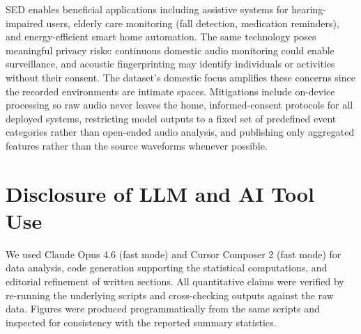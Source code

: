\documentclass{article}
\begin{document}
SED enables beneficial applications including assistive systems for hearing-impaired users, elderly care monitoring (fall detection, medication reminders), and energy-efficient smart home automation. The same technology poses meaningful privacy risks: continuous domestic audio monitoring could enable surveillance, and acoustic fingerprinting may identify individuals or activities without their consent. The dataset's domestic focus amplifies these concerns since the recorded environments are intimate spaces. Mitigations include on-device processing so raw audio never leaves the home, informed-consent protocols for all deployed systems, restricting model outputs to a fixed set of predefined event categories rather than open-ended audio analysis, and publishing only aggregated features rather than the source waveforms whenever possible.

\section{Disclosure of LLM and AI Tool Use}

We used Claude Opus 4.6 (fast mode) and Cursor Composer 2 (fast mode) for data analysis, code generation supporting the statistical computations, and editorial refinement of written sections. All quantitative claims were verified by re-running the underlying scripts and cross-checking outputs against the raw data. Figures were produced programmatically from the same scripts and inspected for consistency with the reported summary statistics.
\end{document}
